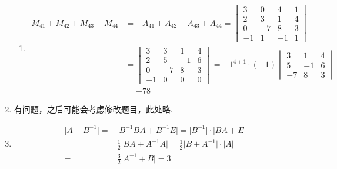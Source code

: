 \begin{enumerate}
\begin{enumerate}
              \item \begin{align*}
                        M_{41}+M_{42}+M_{43}+M_{44}
                         & = -A_{41}+A_{42}-A_{43}+A_{44}
                        = \begin{vmatrix}
                              3  & 0  & 4  & 1 \\
                              2  & 3  & 1  & 4 \\
                              0  & -7 & 8  & 3 \\
                              -1 & 1  & -1 & 1
                          \end{vmatrix}                     \\
                         & = \begin{vmatrix}
                                 3  & 3  & 1  & 4 \\
                                 2  & 5  & -1 & 6 \\
                                 0  & -7 & 8  & 3 \\
                                 -1 & 0  & 0  & 0
                             \end{vmatrix}
                        = {-1}^{4+1} \cdot (-1) \begin{vmatrix}
                                                    3  & 1  & 4 \\
                                                    5  & -1 & 6 \\
                                                    -7 & 8  & 3
                                                \end{vmatrix} \\
                         & = -78
                    \end{align*}
          \end{enumerate}

    \item 有问题，之后可能会考虑修改题目，此处略.

    \item \begin{align*}
              \lvert A+B^{-1} \rvert ={} & \lvert B^{-1}BA+B^{-1}E \rvert = \lvert B^{-1} \rvert \cdot \lvert BA+E \rvert                  \\
              ={}                        & \frac{1}{2} \lvert BA+A^{-1}A \rvert = \frac{1}{2} \lvert B+A^{-1} \rvert \cdot \lvert A \rvert \\
              ={}                        & \frac{3}{2} \lvert A^{-1}+B \rvert = 3
          \end{align*}


\end{enumerate}

